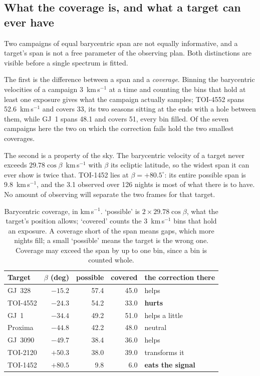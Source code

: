 \documentclass[11pt]{article}
\begin{document}
\subsection{What the coverage is, and what a target can ever have}
\label{sec:coverage}

Two campaigns of equal barycentric span are not equally informative, and a
target's span is not a free parameter of the observing plan. Both distinctions
are visible before a single spectrum is fitted.

The first is the difference between a span and a \emph{coverage}. Binning the
barycentric velocities of a campaign 3~km\,s$^{-1}$ at a time and counting the
bins that hold at least one exposure gives what the campaign actually samples;
TOI-4552 spans 52.6~km\,s$^{-1}$ and covers 33, its two seasons sitting at the
ends with a hole between them, while GJ~1 spans 48.1 and covers 51, every bin
filled. Of the seven campaigns here the two on which the correction fails hold
the two smallest coverages.

The second is a property of the sky. The barycentric velocity of a target never
exceeds $29.78 \cos\beta$~km\,s$^{-1}$ with $\beta$ its ecliptic latitude, so the
widest span it can ever show is twice that. TOI-1452 lies at
$\beta = +80.5^\circ$: its entire possible span is 9.8~km\,s$^{-1}$, and the
3.1 observed over 126 nights is most of what there is to have. No amount of
observing will separate the two frames for that target.

\begin{table}[h]
\centering
\small
\begin{tabular}{lrrrl}
\toprule
Target & $\beta$ (deg) & possible & covered & the correction there\\
\midrule
GJ~328   & $-15.2$ & 57.4 & 45.0 & helps\\
TOI-4552 & $-24.3$ & 54.2 & 33.0 & \textbf{hurts}\\
GJ~1     & $-34.4$ & 49.2 & 51.0 & helps a little\\
Proxima  & $-44.8$ & 42.2 & 48.0 & neutral\\
GJ~3090  & $-49.7$ & 38.4 & 36.0 & helps\\
TOI-2120 & $+50.3$ & 38.0 & 39.0 & transforms it\\
TOI-1452 & $+80.5$ & \phantom{0}9.8 & \phantom{0}6.0 & \textbf{eats the signal}\\
\bottomrule
\end{tabular}
\caption{Barycentric coverage, in km\,s$^{-1}$. `possible' is
$2 \times 29.78\cos\beta$, what the target's position allows; `covered' counts
the 3~km\,s$^{-1}$ bins that hold an exposure. A coverage short of the span
means gaps, which more nights fill; a small `possible' means the target is the
wrong one. Coverage may exceed the span by up to one bin, since a bin is counted
whole.}
\label{tab:coverage}
\end{table}
\end{document}
